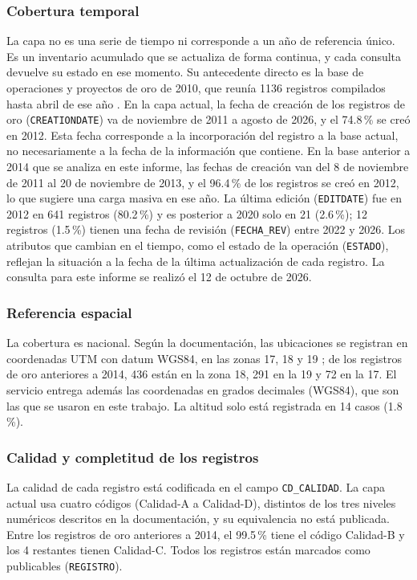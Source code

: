 \documentclass[man,12pt,a4paper,floatsintext,donotrepeattitle]{apa7}
\begin{document}
\subsubsection{Cobertura temporal}

La capa no es una serie de tiempo ni corresponde a un año de referencia único.
Es un inventario acumulado que se actualiza de forma continua, y cada consulta
devuelve su estado en ese momento. Su antecedente directo es la base de
operaciones y proyectos de oro de 2010, que reunía 1136 registros compilados
hasta abril de ese año \parencite{huanacuni2010guia}. En la capa actual, la
fecha de creación de los registros de oro (\texttt{CREATIONDATE}) va de
noviembre de 2011 a agosto de 2026, y el 74.8\,\% se creó en 2012. Esta fecha
corresponde a la incorporación del registro a la base actual, no necesariamente
a la fecha de la información que contiene. En la base anterior a 2014 que se
analiza en este informe, las fechas de creación van del 8 de noviembre de 2011
al 20 de noviembre de 2013, y el 96.4\,\% de los registros se creó en 2012, lo
que sugiere una carga masiva en ese año. La última edición (\texttt{EDITDATE})
fue en 2012 en 641 registros (80.2\,\%) y es posterior a 2020 solo en 21
(2.6\,\%); 12 registros (1.5\,\%) tienen una fecha de revisión
(\texttt{FECHA\_REV}) entre 2022 y 2026. Los atributos que cambian en el tiempo,
como el estado de la operación (\texttt{ESTADO}), reflejan la situación a la
fecha de la última actualización de cada registro. La consulta para este
informe se realizó el 12 de octubre de 2026.

\subsubsection{Referencia espacial}

La cobertura es nacional. Según la documentación, las ubicaciones se registran
en coordenadas UTM con datum WGS84, en las zonas 17, 18 y 19
\parencite{ingemmet2026servicio}; de los registros de oro anteriores a 2014, 436
están en la zona 18, 291 en la 19 y 72 en la 17. El servicio entrega además las coordenadas en
grados decimales (WGS84), que son las que se usaron en este trabajo. La altitud
solo está registrada en 14 casos (1.8\,\%).

\subsubsection{Calidad y completitud de los registros}

La calidad de cada registro está codificada en el campo \texttt{CD\_CALIDAD}. La
capa actual usa cuatro códigos (Calidad-A a Calidad-D), distintos de los tres
niveles numéricos descritos en la documentación, y su equivalencia no está
publicada. Entre los registros de oro anteriores a 2014, el 99.5\,\% tiene el código
Calidad-B y los 4 restantes tienen Calidad-C. Todos los registros están marcados
como publicables (\texttt{REGISTRO}).
\end{document}
